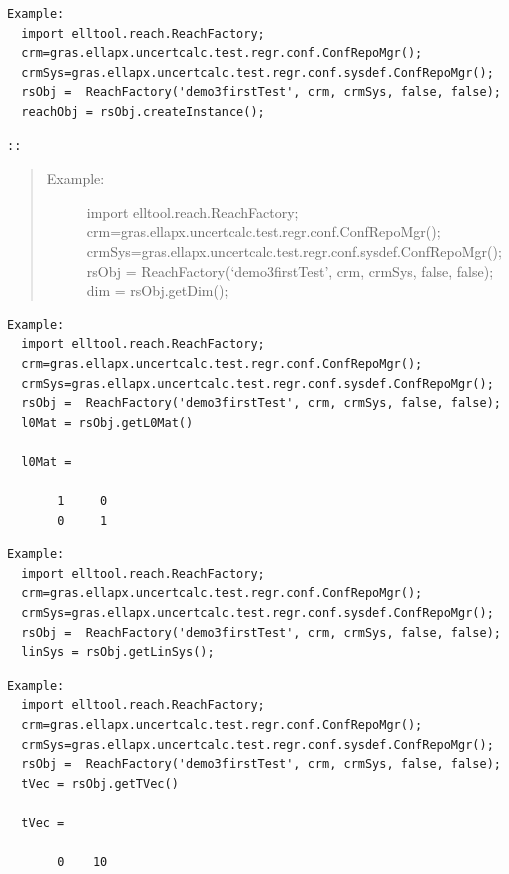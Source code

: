 \documentclass[letterpaper,10pt,english]{sphinxmanual}
\begin{document}
\begin{Verbatim}[commandchars=\\\{\}]
Example:
  import elltool.reach.ReachFactory;
  crm=gras.ellapx.uncertcalc.test.regr.conf.ConfRepoMgr();
  crmSys=gras.ellapx.uncertcalc.test.regr.conf.sysdef.ConfRepoMgr();
  rsObj =  ReachFactory('demo3firstTest', crm, crmSys, false, false);
  reachObj = rsObj.createInstance();
\end{Verbatim}

\begin{Verbatim}[commandchars=\\\{\}]
::
\end{Verbatim}
\begin{quote}
\begin{description}
\item[{Example:}] \leavevmode
import elltool.reach.ReachFactory;
crm=gras.ellapx.uncertcalc.test.regr.conf.ConfRepoMgr();
crmSys=gras.ellapx.uncertcalc.test.regr.conf.sysdef.ConfRepoMgr();
rsObj =  ReachFactory(`demo3firstTest', crm, crmSys, false, false);
dim = rsObj.getDim();

\end{description}
\end{quote}

\begin{Verbatim}[commandchars=\\\{\}]
Example:
  import elltool.reach.ReachFactory;
  crm=gras.ellapx.uncertcalc.test.regr.conf.ConfRepoMgr();
  crmSys=gras.ellapx.uncertcalc.test.regr.conf.sysdef.ConfRepoMgr();
  rsObj =  ReachFactory('demo3firstTest', crm, crmSys, false, false);
  l0Mat = rsObj.getL0Mat()

  l0Mat =

       1     0
       0     1
\end{Verbatim}

\begin{Verbatim}[commandchars=\\\{\}]
Example:
  import elltool.reach.ReachFactory;
  crm=gras.ellapx.uncertcalc.test.regr.conf.ConfRepoMgr();
  crmSys=gras.ellapx.uncertcalc.test.regr.conf.sysdef.ConfRepoMgr();
  rsObj =  ReachFactory('demo3firstTest', crm, crmSys, false, false);
  linSys = rsObj.getLinSys();
\end{Verbatim}

\begin{Verbatim}[commandchars=\\\{\}]
Example:
  import elltool.reach.ReachFactory;
  crm=gras.ellapx.uncertcalc.test.regr.conf.ConfRepoMgr();
  crmSys=gras.ellapx.uncertcalc.test.regr.conf.sysdef.ConfRepoMgr();
  rsObj =  ReachFactory('demo3firstTest', crm, crmSys, false, false);
  tVec = rsObj.getTVec()

  tVec =

       0    10
\end{Verbatim}
\end{document}
